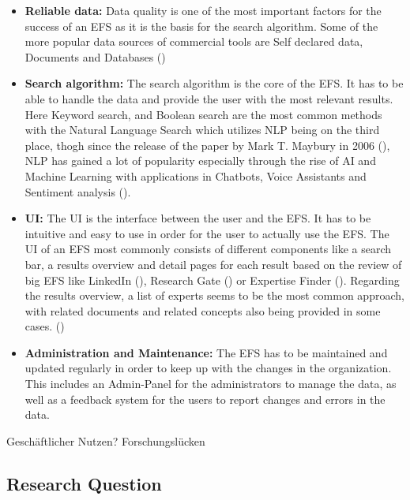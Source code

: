 \begin{itemize}
    \item \textbf{Reliable data:} Data quality is one of the most important factors for the success of an \ac{EFS} as it is the basis for the search algorithm. Some of the
    more popular data sources of commercial tools are Self declared data, Documents and Databases (\cite[page 18]{maybury_expert_2006})
    \item \textbf{Search algorithm:} The search algorithm is the core of the \ac{EFS}. It has to be able to handle the data and provide the user with the most relevant 
    results. Here Keyword search, and Boolean search are the most common methods with the Natural Language Search which utilizes \ac{NLP} being on the third place,
    thogh since the release of the paper by Mark T. Maybury in 2006 (\cite[page 18]{maybury_expert_2006}), \ac{NLP} has gained a lot of popularity especially 
    through the rise of \ac{AI} and Machine Learning with applications in Chatbots, Voice Assistants and Sentiment analysis (\cite{administrator_role_2023}).
    \item \textbf{\ac{UI}:} The \ac{UI} is the interface between the user and the \ac{EFS}. It has to be intuitive and easy to use in order for the user to actually use the \ac{EFS}.
    The \ac{UI} of an \ac{EFS} most commonly consists of different components like a search bar, a results overview and detail pages for each result based on the review of big 
    \ac{EFS} like LinkedIn (\cite{noauthor_linkedin_nodate}), Research Gate (\cite{noauthor_researchgate_nodate}) or Expertise Finder (\cite{noauthor_expertise_nodate-1}). 
    Regarding the results overview, a list of experts seems to be the most common approach, with related documents and related concepts also being provided in some 
    cases. (\cite[page 18]{maybury_expert_2006})
    \item \textbf{Administration and Maintenance:} The \ac{EFS} has to be maintained and updated regularly in order to keep up with the changes in the organization. This includes an 
    Admin-Panel for the administrators to manage the data, as well as a feedback system for the users to report changes and errors in the data.

\end{itemize}

Geschäftlicher Nutzen?
Forschungslücken

\subsection{Research Question}

